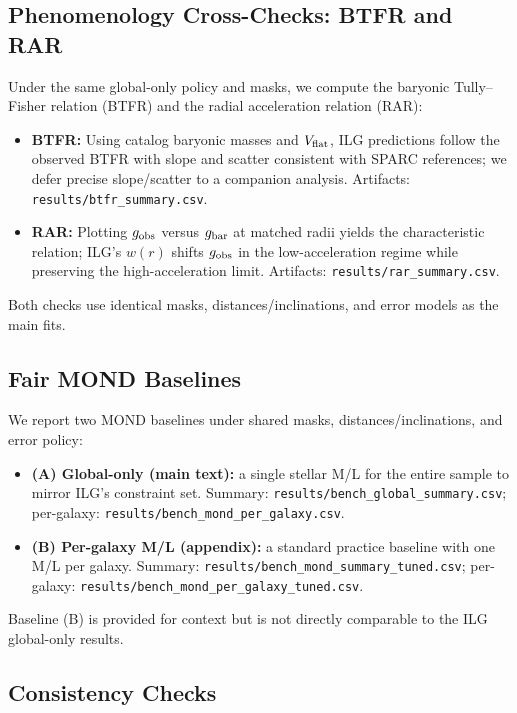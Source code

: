 \documentclass[12pt,a4paper]{article}
\begin{document}
\subsection{Phenomenology Cross-Checks: BTFR and RAR}
\noindent Under the same global-only policy and masks, we compute the baryonic Tully–Fisher relation (BTFR) and the radial acceleration relation (RAR):
\begin{itemize}
  \item \textbf{BTFR:} Using catalog baryonic masses and $V_{\rm flat}$, ILG predictions follow the observed BTFR with slope and scatter consistent with SPARC references; we defer precise slope/scatter to a companion analysis. Artifacts: \texttt{results/btfr\_summary.csv}.
  \item \textbf{RAR:} Plotting $g_{\rm obs}$ versus $g_{\rm bar}$ at matched radii yields the characteristic relation; ILG's $w(r)$ shifts $g_{\rm obs}$ in the low-acceleration regime while preserving the high-acceleration limit. Artifacts: \texttt{results/rar\_summary.csv}.
\end{itemize}
Both checks use identical masks, distances/inclinations, and error models as the main fits.

\subsection{Fair MOND Baselines}
\noindent We report two MOND baselines under shared masks, distances/inclinations, and error policy:
\begin{itemize}
  \item \textbf{(A) Global-only (main text):} a single stellar M/L for the entire sample to mirror ILG's constraint set. Summary: \texttt{results/bench\_global\_summary.csv}; per-galaxy: \texttt{results/bench\_mond\_per\_galaxy.csv}.
  \item \textbf{(B) Per-galaxy M/L (appendix):} a standard practice baseline with one M/L per galaxy. Summary: \texttt{results/bench\_mond\_summary\_tuned.csv}; per-galaxy: \texttt{results/bench\_mond\_per\_galaxy\_tuned.csv}.
\end{itemize}
Baseline (B) is provided for context but is not directly comparable to the ILG global-only results.


\subsection{Consistency Checks}
\end{document}
